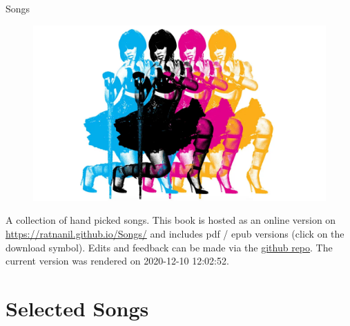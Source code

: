\documentclass[
]{book}
\author{}
\date{\vspace{-2.5em}}
\begin{document}

\begin{titlepage}
\begin{center}
  

\end{center}
\vspace{1.5cm}
\begin{center}

{\LARGE Songs}

\end{center}
 \vspace{1cm}

\begin{figure}[htbp]
  \centering
  \includegraphics[width=1\textwidth]{misc/title.png}
  \label{titelbild}
\end{figure}

\begin{center}
\textbf{}


\end{center} 

\vspace{1.0cm}


\end{titlepage}

{
\setcounter{tocdepth}{1}
\tableofcontents
}
A collection of hand picked songs. This book is hosted as an online version on \url{https://ratnanil.github.io/Songs/} and includes pdf / epub versions (click on the download symbol). Edits and feedback can be made via the \href{https://github.com/ratnanil/songs}{github repo}. The current version was rendered on 2020-12-10 12:02:52.

\hypertarget{selected-songs}{%
\chapter{Selected Songs}\label{selected-songs}}
\end{document}
